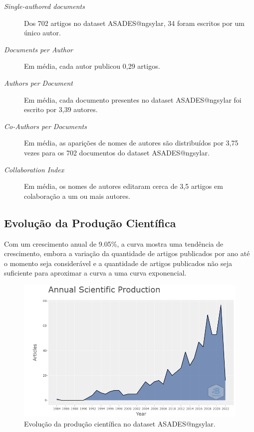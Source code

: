 \begin{description}
\item [\textit{Single-authored documents}] Dos 702 artigos no dataset ASADES@ngsylar, 34 foram escritos por um único autor.

\item [\textit{Documents per Author}] Em média, cada autor publicou 0,29 artigos.

\item [\textit{Authors per Document}] Em média, cada documento presentes no dataset ASADES@ngsylar foi escrito por 3,39 autores.

\item [\textit{Co-Authors per Documents}] Em média, as aparições de nomes de autores são distribuídos por 3,75 vezes para os 702 documentos do dataset ASADES@ngsylar.

\item [\textit{Collaboration Index}] Em média, os nomes de autores editaram cerca de 3,5 artigos em colaboração a um ou mais autores.
\end{description}

\subsection{Evolução da Produção Científica}

Com um crescimento anual de 9.05\%, a curva mostra uma tendência de crescimento, embora a variação da quantidade de artigos publicados por ano até o momento seja considerável e a quantidade de artigos publicados não seja suficiente para aproximar a curva a uma curva exponencial.

\begin{figure}[H]
    \centering
    \includegraphics[width=1\textwidth]{experiments/ngsylar/PesqBibliogr/Imagens/ASADES-AnnualScientificProduction.png}
    \caption{Evolução da produção científica no dataset ASADES@ngsylar.}
    \label{fig:evol:anual:ASADES@ngsylar}
\end{figure}

